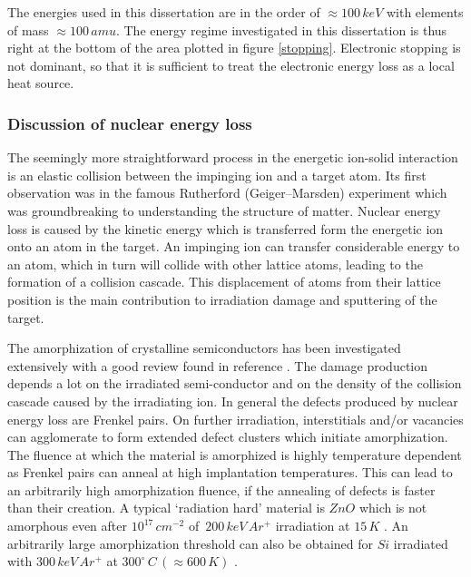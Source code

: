 The energies used in this dissertation are in the order of $\approx 100\,keV$ with elements of mass $\approx 100\,amu$. The energy regime investigated in this dissertation is thus right at the bottom of the area plotted in figure \ref{stopping}. Electronic stopping is not dominant, so that it is sufficient to treat the electronic energy loss as a local heat source.

\subsubsection{Discussion of nuclear energy loss}

The seemingly more straightforward process in the energetic ion-solid interaction is an elastic collision between the impinging ion and a target atom. Its first observation was in the famous Rutherford (Geiger–Marsden) experiment \cite{rutherford_scattering_1911} which was groundbreaking to understanding the structure of matter. Nuclear energy loss is caused by the kinetic energy which is transferred form the energetic ion onto an atom in the target. An impinging ion can transfer considerable energy to an atom, which in turn will collide with other lattice atoms, leading to the formation of a collision cascade. This displacement of atoms from their lattice position is the main contribution to irradiation damage and sputtering of the target. 

The amorphization of crystalline semiconductors has been investigated extensively with a good review found in reference \cite{wesch_damage_2012}. The damage production depends a lot on the irradiated semi-conductor and on the density of the collision cascade caused by the irradiating ion. In general the defects produced by nuclear energy loss are Frenkel pairs. On further irradiation, interstitials and/or vacancies can agglomerate to form extended defect clusters which initiate amorphization. The fluence at which the material is amorphized is highly temperature dependent as Frenkel pairs can anneal at high implantation temperatures. This can lead to an arbitrarily high amorphization fluence, if the annealing of defects is faster than their creation. A typical `radiation hard' material is $ZnO$ which is not amorphous even after $10^{17}\,cm^{-2}$ of $\,200\,keV\,Ar^+$ irradiation at $15\,K$ \cite{wesch_damage_2012}. An arbitrarily large amorphization threshold can also be obtained for $Si$ irradiated with $300\,keV\,Ar^+$ at $300^\circ\,C\,(\approx 600\,K)$ \cite{pelaz_ion-beam-induced_2004}.

